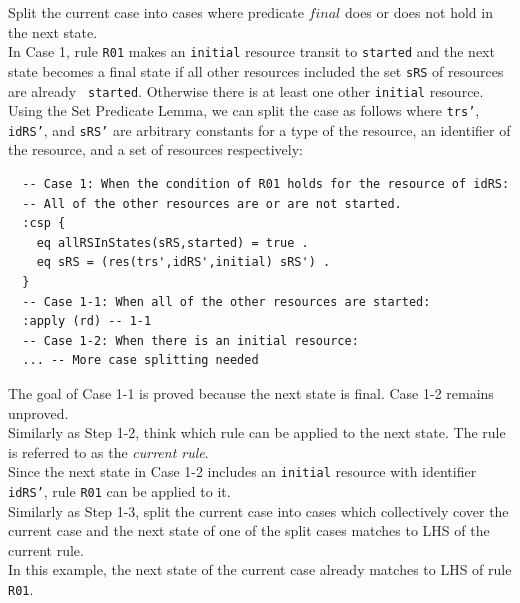 \documentclass[12pt]{report}
\begin{document}
 Split the current case into cases where
predicate $final$ does or does not hold in the next state.\\ 
In Case 1, rule {\tt R01} makes an {\tt initial} resource transit to
{\tt started} and the next state becomes a final state if all other
resources included the set {\tt sRS} of resources are already {\tt
  started}. Otherwise there is at least one other {\tt initial}
resource.  Using the Set Predicate Lemma, we can split the case as follows where
{\tt trs'}, {\tt idRS'}, and {\tt sRS'} are arbitrary constants for a
type of the resource, an identifier of the resource, and a set of
resources respectively:
\small
\begin{verbatim}
  -- Case 1: When the condition of R01 holds for the resource of idRS:
  -- All of the other resources are or are not started.
  :csp {
    eq allRSInStates(sRS,started) = true .
    eq sRS = (res(trs',idRS',initial) sRS') .
  }
  -- Case 1-1: When all of the other resources are started:
  :apply (rd) -- 1-1
  -- Case 1-2: When there is an initial resource:
  ... -- More case splitting needed
\end{verbatim}
\normalsize
The goal of Case 1-1 is proved because the next state is final.  Case
1-2 remains unproved.\\

 Similarly as Step 1-2, think which rule can
be applied to the next state. The rule is referred to as the {\it current
rule}.\\
Since the next state in Case 1-2 includes an {\tt initial} resource
with identifier {\tt idRS'}, rule {\tt R01} can be applied to it.\\

 Similarly as Step 1-3, split the current case
into cases which collectively cover the current case and the next state of one of the split cases
matches to LHS of the current rule. \\ 
In this example, the next state of the current case already matches to LHS of rule {\tt R01}.\\
\end{document}
